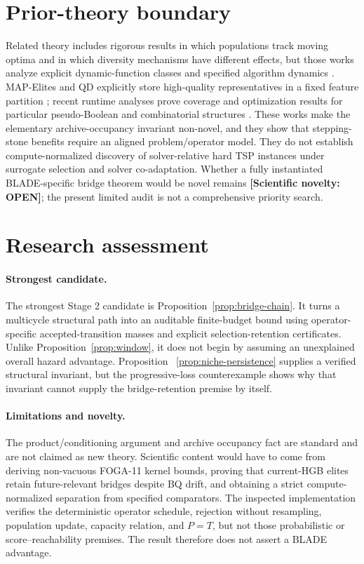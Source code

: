 \documentclass[11pt]{article}
\newcommand{\nstatus}[1]{\textbf{[Scientific novelty: #1]}}
\begin{document}
\section{Prior-theory boundary}
Related theory includes rigorous results in which populations track moving
optima and in which diversity mechanisms have different effects, but those
works analyze explicit dynamic-function classes and specified algorithm
dynamics \cite{Dang2017,OlivetoZarges2015}. MAP-Elites and QD explicitly store
high-quality representatives in a fixed feature partition
\cite{MouretClune2015,Pugh2016}; recent runtime analyses prove coverage and
optimization results for particular pseudo-Boolean and combinatorial
structures \cite{BossekSudholt2024,Qian2024}. These works make the elementary
archive-occupancy invariant non-novel, and they show that stepping-stone
benefits require an aligned problem/operator model. They do not establish
compute-normalized discovery of solver-relative hard TSP instances under
surrogate selection and solver co-adaptation. Whether a fully instantiated
BLADE-specific bridge theorem would be novel remains \nstatus{OPEN}; the
present limited audit is not a comprehensive priority search.








\section{Research assessment}
\paragraph{Strongest candidate.}
The strongest Stage 2 candidate is Proposition~\ref{prop:bridge-chain}. It
turns a multicycle structural path into an auditable finite-budget bound using
operator-specific accepted-transition masses and explicit selection-retention
certificates. Unlike Proposition~\ref{prop:window}, it does not begin by
assuming an unexplained overall hazard advantage. Proposition
~\ref{prop:niche-persistence} supplies a verified structural invariant, but
the progressive-loss counterexample shows why that invariant cannot supply
the bridge-retention premise by itself.

\paragraph{Limitations and novelty.}
The product/conditioning argument and archive occupancy fact are standard and
are not claimed as new theory. Scientific content would have to come from
deriving non-vacuous FOGA-11 kernel bounds, proving that current-HGB elites
retain future-relevant bridges despite BQ drift, and obtaining a strict
compute-normalized separation from specified comparators. The inspected
implementation verifies the deterministic operator schedule, rejection
without resampling, population update, capacity relation, and $P=T$, but not
those probabilistic or score--reachability premises. The result therefore does
not assert a BLADE advantage.
\end{document}

